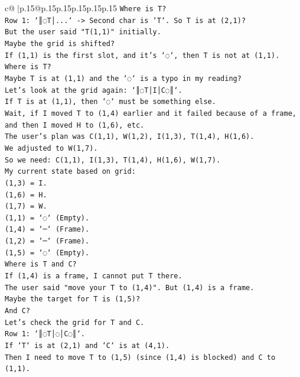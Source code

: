 \documentclass{article}
\begin{document}
{\begin{supertabular}{c@{$\;$}|p{.15\linewidth}@{}p{.15\linewidth}p{.15\linewidth}p{.15\linewidth}p{.15\linewidth}p{.15\linewidth}}
{{{\texttt{Where is T?} \\
\texttt{Row 1: `║◌T│...` {-}> Second char is `T`. So T is at (2,1)?} \\
\texttt{But the user said "T(1,1)" initially.} \\
\texttt{Maybe the grid is shifted?} \\
\texttt{If (1,1) is the first slot, and it's `◌`, then T is not at (1,1).} \\
\texttt{Where is T?} \\
\texttt{Maybe T is at (1,1) and the `◌` is a typo in my reading?} \\
\texttt{Let's look at the grid again: `║◌T│I│C◌║`.} \\
\texttt{If T is at (1,1), then `◌` must be something else.} \\
\texttt{Wait, if I moved T to (1,4) earlier and it failed because of a frame, and then I moved H to (1,6), etc.} \\
\texttt{The user's plan was C(1,1), W(1,2), I(1,3), T(1,4), H(1,6).} \\
\texttt{We adjusted to W(1,7).} \\
\texttt{So we need: C(1,1), I(1,3), T(1,4), H(1,6), W(1,7).} \\
\texttt{My current state based on grid:} \\
\texttt{(1,3) = I.} \\
\texttt{(1,6) = H.} \\
\texttt{(1,7) = W.} \\
\texttt{(1,1) = `◌` (Empty).} \\
\texttt{(1,4) = `─` (Frame).} \\
\texttt{(1,2) = `─` (Frame).} \\
\texttt{(1,5) = `◌` (Empty).} \\
\texttt{Where is T and C?} \\
\texttt{If (1,4) is a frame, I cannot put T there.} \\
\texttt{The user said "move your T to (1,4)". But (1,4) is a frame.} \\
\texttt{Maybe the target for T is (1,5)?} \\
\texttt{And C?} \\
\texttt{Let's check the grid for T and C.} \\
\texttt{Row 1: `║◌T│◌│C◌║`.} \\
\texttt{If `T` is at (2,1) and `C` is at (4,1).} \\
\texttt{Then I need to move T to (1,5) (since (1,4) is blocked) and C to (1,1).} \\
}}}
\end{supertabular}}
\end{document}
